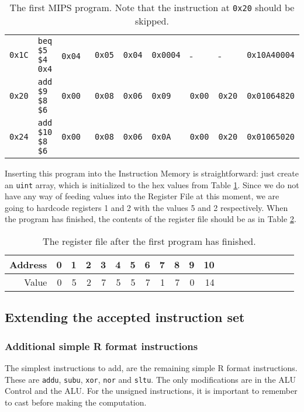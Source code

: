 \begin{table}
\begin{tabular}{rllllllll}
        \texttt{0x1C} & \texttt{beq \$5 \$4 0x4} & \texttt{0x04} &
        \texttt{0x05} & \texttt{0x04} & \texttt{0x0004} & - &
        - & \texttt{0x10A40004} \\ %

        \texttt{0x20} & \texttt{add \$9 \$8 \$6} & \texttt{0x00} &
        \texttt{0x08} & \texttt{0x06} & \texttt{0x09} & \texttt{0x00} &
        \texttt{0x20} & \texttt{0x01064820} \\ %

        \texttt{0x24} & \texttt{add \$10 \$8 \$6} & \texttt{0x00} &
        \texttt{0x08} & \texttt{0x06} & \texttt{0x0A} & \texttt{0x00} &
        \texttt{0x20} & \texttt{0x01065020} \\ %
        \bottomrule
    \end{tabular}
    \caption{The first MIPS program. Note that the instruction at \texttt{0x20}
    should be skipped.}
    \label{tab:first-program}
\end{table}

Inserting this program into the Instruction Memory is straightforward: just
create an \texttt{uint} array, which is initialized to the hex values from
Table \ref{tab:first-program}. Since we do not have any way of feeding values
into the Register File at this moment, we are going to hardcode registers 1 and
2 with the values 5 and 2 respectively. When the program has finished, the
contents of the register file should be as in Table \ref{tab:first-result}.
\begin{table}
    \centering
    \begin{tabular}{rrrrrrrrrrrrrrrrrrrr}
        \toprule
        Address & 0 & 1 & 2 & 3 & 4 & 5 & 6 & 7 & 8 & 9 & 10 \\
        \midrule
        Value & 0 & 5 & 2 & 7 & 5 & 5 & 7 & 1 & 7 & 0 & 14 \\
        \bottomrule
    \end{tabular}
    \caption{The register file after the first program has finished.}
    \label{tab:first-result}
\end{table}

\subsection{Extending the accepted instruction set}
\subsubsection*{Additional simple R format instructions}
The simplest instructions to add, are the remaining simple R format
instructions. These are \texttt{addu}, \texttt{subu}, \texttt{xor},
\texttt{nor} and \texttt{sltu}. The only modifications are in the ALU Control
and the ALU. For the unsigned instructions, it is important to remember to cast
before making the computation.

